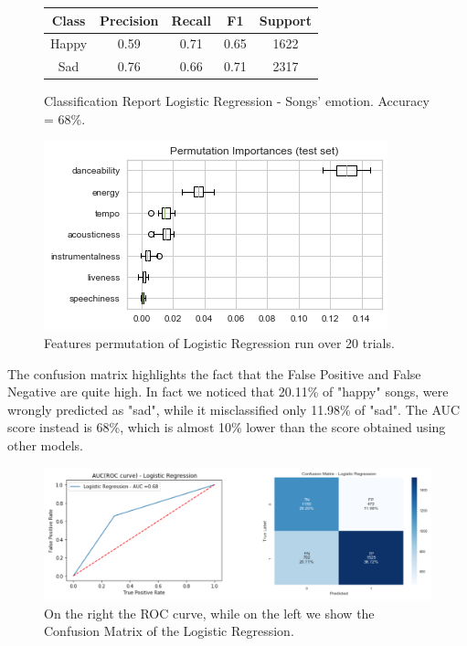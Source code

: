 \begin{figure}[!htb]
   \begin{minipage}{0.46\textwidth}
     \begin{tabular}{ccccc}
     \hline
     \textbf{Class} & \textbf{Precision} & \textbf{Recall} & \textbf{F1} & \textbf{Support} \\ \hline
     Happy          & 0.59               & 0.71            & 0.65        & 1622             \\ \hline
     Sad            & 0.76               & 0.66            & 0.71        & 2317            
     \end{tabular}
     \caption{Classification Report Logistic Regression - Songs' emotion.
Accuracy = 68\%.}
     \label{Classification report: Test set Ripper}
   \end{minipage}\hfill
   \begin{minipage}{0.42\textwidth}
     \centering
     \includegraphics[width=1\linewidth]{images/perm log-reg.png}
     \caption{Features permutation of Logistic Regression run over 20 trials.}\label{Fig:Data2}
   \end{minipage}
\end{figure}
\newpage
The confusion matrix highlights the fact that the False Positive and False Negative are quite high. In fact we noticed that 20.11\% of "happy" songs, were wrongly predicted as "sad", while it misclassified only 11.98\% of "sad". The AUC score instead is 68\%, which is almost 10\% lower than the score obtained using other models. 


\begin{figure}[h]
  \centering
  \includegraphics[width=0.74\linewidth]{images/log-reg_ROC-CFM.png}
  \caption{On the right the ROC curve, while on the left we show the Confusion Matrix of the Logistic Regression.
  }
\end{figure}


